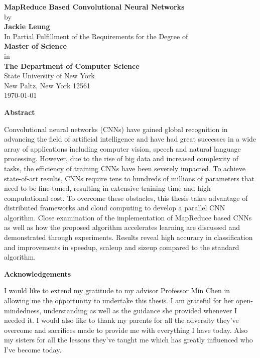 \documentclass[12pt]{report}
\begin{document}
\begin{titlepage}
\begin{center}
\vfill
\Large{\textbf{MapReduce Based Convolutional Neural Networks}}\\[3mm]
\vfill
by\\ 
\textbf{Jackie Leung}\\
In Partial Fulfillment of the Requirements for the Degree of\\
\textbf{Master of Science}\\
\vfill
in\\
\textbf{The Department of Computer Science}\\
State University of New York\\
New Paltz, New York 12561\\
\today
\end{center}
\end{titlepage}

\thispagestyle{plain}
\begin{center}
\textbf{Abstract}
\end{center}

Convolutional neural networks (CNNs) have gained global recognition in advancing the field of artificial intelligence and have had great successes in a wide array of applications including computer vision, speech and natural language processing. However, due to the rise of big data and increased complexity of tasks, the efficiency of training CNNs have been severely impacted. To achieve state-of-art results, CNNs require tens to hundreds of millions of parameters that need to be fine-tuned, resulting in extensive training time and high computational cost. To overcome these obstacles, this thesis takes advantage of distributed frameworks and cloud computing to develop a parallel CNN algorithm. Close examination of the implementation of MapReduce based CNNs as well as how the proposed algorithm accelerates learning are discussed and demonstrated through experiments. Results reveal high accuracy in classification and improvements in speedup, scaleup and sizeup compared to the standard algorithm.

\newpage
\thispagestyle{plain}
\begin{center}
\textbf{Acknowledgements}
\end{center}

I would like to extend my gratitude to my advisor Professor Min Chen in allowing me the opportunity to undertake this thesis. I am grateful for her open-mindedness, understanding as well as the guidance she provided whenever I needed it. I would also like to thank my parents for all the adversity they've overcome and sacrifices made to provide me with everything I have today. Also my sisters for all the lessons they've taught me which has greatly influenced who I've become today.
\end{document}
